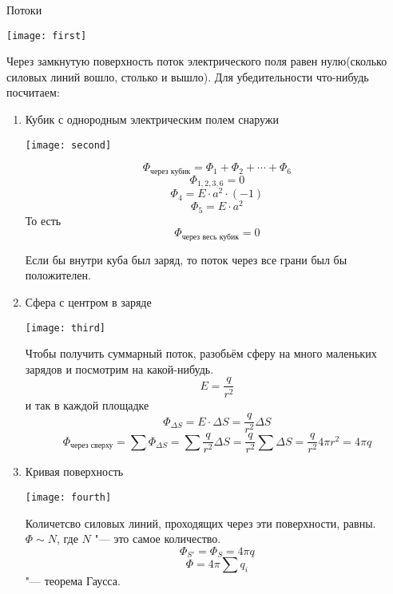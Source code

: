 
\begin{section}{Потоки}

	\begin{center}
	\texttt{[image: first]}
	\end{center}

Через замкнутую поверхность поток электрического поля равен нулю(сколько силовых линий вошло, столько и вышло). 
Для убедительности что-нибудь посчитаем:
\begin{enumerate}

\item Кубик с однородным электрическим полем снаружи

	\begin{center}
	\texttt{[image: second]}
	\end{center}

	\[\Phi_{\text{через кубик}} = \Phi_1 + \Phi_2 + \cdots + \Phi_6\]
	\[\Phi_{1, 2, 3, 6} = 0\]
	\[\Phi_4 = E \cdot a^2 \cdot (-1)\]
	\[\Phi_5 = E \cdot a^2\]
	То есть
	\[\Phi_{\text{через весь кубик}} = 0\]
	\begin{Rem}
	Если бы внутри куба был заряд, то поток через все грани был бы положителен.
	\end{Rem}
	
\item Сфера с центром в заряде

	\begin{center}
	\texttt{[image: third]}
	\end{center}

	Чтобы получить суммарный поток, разобьём сферу на много маленьких зарядов и посмотрим на какой-нибудь.
	\[E = \frac{q}{r^2}\]
	и так в каждой площадке
	\[\Phi_{\Delta S} = E \cdot \Delta S = \frac{q}{r^2}\Delta S\]
	\[\Phi_{\text{через сверху}} = \sum \Phi_{\Delta S} = \sum \frac{q}{r^2}\Delta S = \frac{q}{r^2}\sum\Delta S 
	= \frac{q}{r^2}4\pi r^2 = 4 \pi q\]
	
\item Кривая поверхность
	
	\begin{center}
	\texttt{[image: fourth]}
	\end{center}

	Количетсво силовых линий, проходящих через эти поверхности, равны. $\Phi \sim N$, где $N$ "--- это самое количество.
	\[\Phi_{S'} = \Phi_S = 4\pi q\]
	\[\Phi = 4\pi\sum q_i\] "--- теорема Гаусса.


\end{enumerate}
\end{section}
